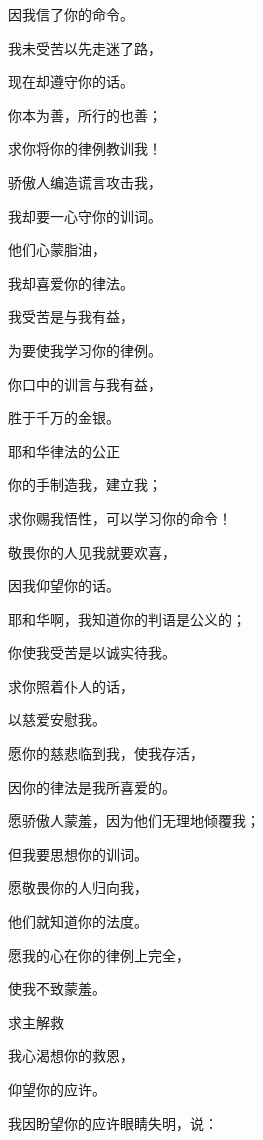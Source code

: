 {\par }{\Q 因我信了你的命令。
\par }{\Q {}我未受苦以先走迷了路，
\par }{\Q 现在却遵守你的话。
\par }{\Q {}你本为善，所行的也善；
\par }{\Q 求你将你的律例教训我！
\par }{\Q {}骄傲人编造谎言攻击我，
\par }{\Q 我却要一心守你的训词。
\par }{\Q {}他们心蒙脂油，
\par }{\Q 我却喜爱你的律法。
\par }{\Q {}我受苦是与我有益，
\par }{\Q 为要使我学习你的律例。
\par }{\Q {}你口中的训言与我有益，
\par }{\Q 胜于千万的金银。
\par }{\SH 耶和华律法的公正
\par }{\Q {}你的手制造我，建立我；
\par }{\Q 求你赐我悟性，可以学习你的命令！
\par }{\Q {}敬畏你的人见我就要欢喜，
\par }{\Q 因我仰望你的话。
\par }{\Q {}耶和华啊，我知道你的判语是公义的；
\par }{\Q 你使我受苦是以诚实待我。
\par }{\Q {}求你照着{}仆人的话，
\par }{\Q 以慈爱安慰我。
\par }{\Q {}愿你的慈悲临到我，使我存活，
\par }{\Q 因你的律法是我所喜爱的。
\par }{\Q {}愿骄傲人蒙羞，因为他们无理地倾覆我；
\par }{\Q 但我要思想你的训词。
\par }{\Q {}愿敬畏你的人归向我，
\par }{\Q 他们就知道你的法度。
\par }{\Q {}愿我的心在你的律例上完全，
\par }{\Q 使我不致蒙羞。
\par }{\SH 求主解救
\par }{\Q {}我心渴想你的救恩，
\par }{\Q 仰望你的应许。
\par }{\Q {}我因盼望你的应许眼睛失明，说：
}

